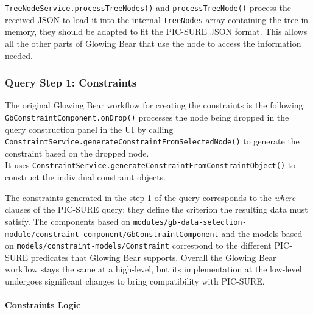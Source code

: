 \verb|TreeNodeService.processTreeNodes()| and \verb|processTreeNode()| process the received JSON to load it into the internal \verb|treeNodes| array containing the tree in memory, they should be adapted to fit the PIC-SURE JSON format.
This allows all the other parts of Glowing Bear that use the node to access the information needed.


\subsubsection{Query Step 1: Constraints}

The original Glowing Bear workflow for creating the constraints is the following: \\
\verb|GbConstraintComponent.onDrop()| processes the node being dropped in the query construction panel in the UI by calling \verb|ConstraintService.generateConstraintFromSelectedNode()| to generate the constraint based on the dropped node. \\
It uses \verb|ConstraintService.generateConstraintFromConstraintObject()| to construct the individual constraint objects.

The constraints generated in the step 1 of the query corresponds to the \emph{where} clauses of the PIC-SURE query: they define the criterion the resulting data must satisfy.
The components based on \verb|modules/gb-data-selection-module/constraint-component/GbConstraintComponent| and the models based on \verb|models/constraint-models/Constraint| correspond to the different PIC-SURE predicates that Glowing Bear supports.
Overall the Glowing Bear workflow stays the same at a high-level, but its implementation at the low-level undergoes significant changes to bring compatibility with PIC-SURE.

\paragraph{Constraints Logic}
\label{sec:gb-predicates}

